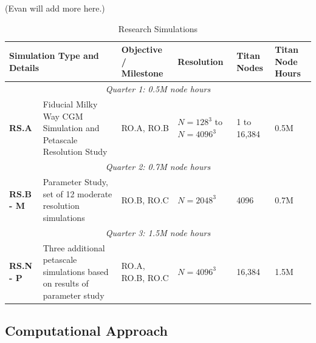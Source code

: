 \documentclass[11pt,letterpaper,english]{article}
\begin{document}
(Evan will add more here.)



\begin{table}[h]
\caption{Research Simulations}
\label{table:RS}
\begin{tabular}{|l|p{2in}|p{1in}|p{0.7in}|p{0.5in}|p{0.7in}|} 
\hline
\multicolumn{2}{|l|}{\bf Simulation Type and Details} & {\bf Objective / Milestone} & {\bf Resolution} & {\bf Titan Nodes} & {\bf Titan Node Hours} \\ \hline
\multicolumn{6}{|c|}{\it Quarter 1: 0.5M node hours} \\ \hline
\textbf{RS.A} & Fiducial Milky Way CGM Simulation and Petascale Resolution Study & RO.A, RO.B & $N = 128^3$ to $N=4096^3$ & 1 to 16,384 & 0.5M\\ \hline
\multicolumn{6}{|c|}{\it Quarter 2: 0.7M node hours} \\ \hline
\textbf{RS.B - M} & Parameter Study, set of 12 moderate resolution simulations & RO.B, RO.C & $N=2048^3$ & 4096 & 0.7M\\ \hline
\multicolumn{6}{|c|}{\it Quarter 3: 1.5M node hours} \\ \hline
\textbf{RS.N - P} & Three additional petascale simulations based on results of parameter study & RO.A, RO.B, RO.C & $N=4096^3$ & 16,384 & 1.5M\\ \hline
\end{tabular}
\end{table}


\vspace{-.25in}
\subsection{Computational Approach}
\vspace{-.2in}


\end{document}
